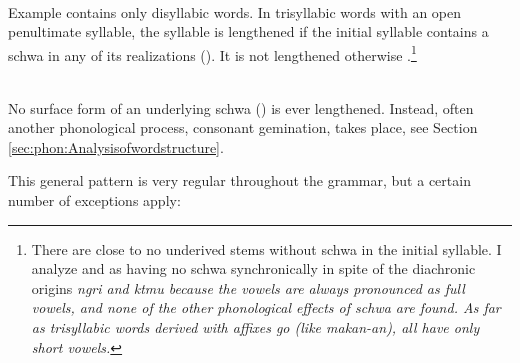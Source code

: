  \\

Example  contains only disyllabic words.
In trisyllabic words with an open penultimate syllable, the syllable is lengthened if the initial syllable contains a schwa  in any of its realizations (). It is not lengthened otherwise .\footnote{There are close to no underived stems without schwa in the initial syllable. I analyze  and  as having no schwa synchronically in spite of the diachronic origins \em n\E g\E ri \em and \em k\E t\E mu \em because the vowels are always pronounced as full vowels, and none of the other phonological effects of schwa are found. As far as trisyllabic words derived with affixes go (like \em makan-an\em), all have only short vowels.}




 \\

No surface form of an underlying schwa () is ever lengthened. Instead, often another phonological process, consonant gemination, takes place, see Section \ref{sec:phon:Analysisofwordstructure}.

This general pattern is very regular throughout the grammar, but a certain number of exceptions apply:


